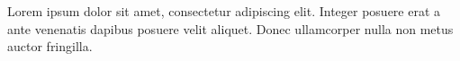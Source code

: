 Lorem ipsum dolor sit amet, consectetur adipiscing elit. Integer posuere erat
a ante venenatis dapibus posuere velit aliquet. Donec ullamcorper nulla non
metus auctor fringilla.
